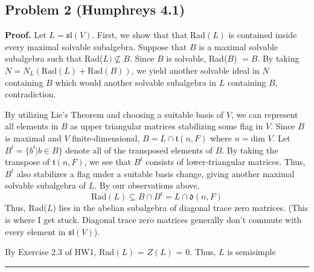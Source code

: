 \documentclass[12pt]{article}%
\newenvironment{proof}[1][Proof]{\textbf{#1.} }{\ \rule{0.5em}{0.5em}}
\begin{document}
\subsection*{Problem 2 (Humphreys 4.1)}
\begin{proof}
 Let $L = \mathfrak{sl}(V)$.
 First, we show that that Rad$(L)$ is contained inside every maximal solvable subalgebra. Suppose that $B$ is a maximal solvable subalgebra such that Rad($L) \not\subseteq B$. Since $B$ is solvable, Rad($B$) $= B$. By taking $N = N_L(\text{Rad}(L) + \text{Rad}(B))$, we yield another solvable ideal in $N$ containing $B$ which would another solvable subalgebra in $L$ containing $B$, contradiction. \newline

 By utilizing Lie's Theorem and choosing a suitable basis of $V$, we can represent all elements in $B$ as upper triangular matrices stabilizing some flag in $V$. Since $B$ is maximal and $V$ finite-dimensional, $B = L \cap \mathfrak{t}(n,F)$ where $n = \text{dim } V$. Let $B^t = \{ b^t \vert b \in B \}$ denote all of the transposed elements of $B$. By taking the transpose of $\mathfrak{t}(n,F)$, we see that $B^t$ consists of lower-triangular matrices. Thus, $B^t$ also stabilizes a flag under a suitable basis change, giving another maximal solvable subalgebra of $L$. By our observations above,
 $$ \text{Rad}(L) \subseteq B \cap B^t = L \cap \mathfrak{d}(n,F) $$
 Thus, Rad($L$) lies in the abelian subalgebra of diagonal trace zero matrices.
 (This is where I get stuck. Diagonal trace zero matrices generally don't commute with every element in $\mathfrak{sl}(V)$).

 By Exercise 2.3 of HW1, Rad$(L)$ = $Z(L)$ = 0. Thus, $L$ is semisimple
\end{proof}
\end{document}
